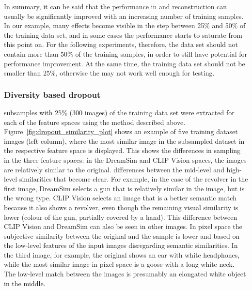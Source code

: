 In summary, it can be said that the performance in  and reconstruction can usually be significantly improved with an increasing number of training samples. In our example, many effects become visible in the step between 25\% and 50\% of the training data set, and in some cases the performance starts to saturate from this point on. For the following experiments, therefore, the data set should not contain more than 50\% of the training samples, in order to still have potential for performance improvement. At the same time, the training data set should not be smaller than 25\%, otherwise the  may not work well enough for testing.


\subsubsection{Diversity based dropout}
 subsamples with 25\% (300 images) of the training data set were extracted for each of the feature spaces using the method described above. Figure~\ref{fig:dropout_similarity_plot} shows an example of five training dataset images (left column), where the most similar image in the subsampled dataset in the respective feature space is displayed. This shows the differences in sampling in the three feature spaces: in the DreamSim and CLIP Vision spaces, the images are relatively similar to the original.  differences between the mid-level and high-level similarities that become clear. For example, in the case of the revolver in the first image, DreamSim selects a gun that is relatively similar in the image, but is the wrong type. CLIP Vision selects an image that is a better semantic match because it also shows a revolver, even though the remaining visual similarity is lower (colour of the gun, partially covered by a hand). This difference between CLIP Vision and DreamSim can also be seen in other images. In pixel space the subjective similarity between the original and the sample is lower and based on the low-level features of the input images disregarding semantic similarities. In the third image, for example, the original shows an ear with white headphones, while the most similar image in pixel space is a goose with a long white neck. The low-level match between the images is presumably an elongated white object in the middle. 

